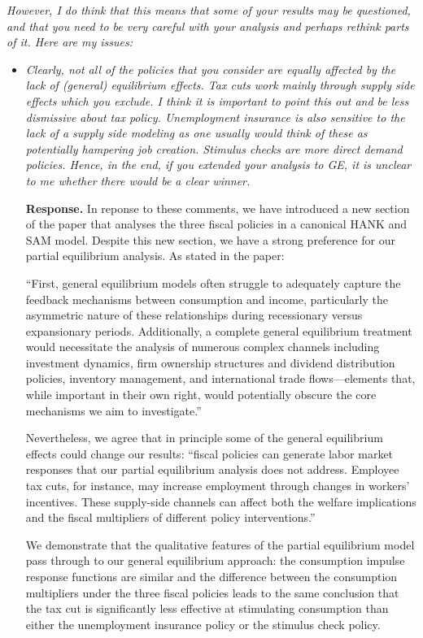 \documentclass[12pt,letterpaper,english]{article}
\begin{document}
\begin{enumerate}
\textit{However, I do think that this means that some of your results may be questioned,	and that you need to be very careful with your analysis and perhaps rethink parts of it. Here are my issues:}

\begin{itemize}
	\item \textit{Clearly, not all of the policies that you consider are equally affected by the lack of (general) equilibrium effects. Tax cuts work mainly through supply		side effects which you exclude. I think it is important to point this out and be less dismissive about tax policy. Unemployment insurance is also sensitive to the lack of a supply side modeling as one usually would think of these as potentially hampering job creation. Stimulus checks are more direct demand policies. Hence, in the end, if you extended your analysis to GE, it is unclear to me whether there would be a clear winner.}
	
\noindent \textbf{Response.} In reponse to these comments, we have introduced a new section of the paper that analyses the three fiscal policies in a canonical HANK and SAM model. Despite this new section, we have a strong preference for our partial equilibrium analysis. As stated in the paper:

``First, general equilibrium models often struggle to adequately capture the feedback mechanisms between consumption and income, particularly the asymmetric nature of these relationships during recessionary versus expansionary periods. Additionally, a complete general equilibrium treatment would necessitate the analysis of numerous complex channels including investment dynamics, firm ownership structures and dividend distribution policies, inventory management, and international trade flows—elements that, while important in their own right, would potentially obscure the core mechanisms we aim to investigate.''

Nevertheless, we agree that in principle some of the general equilibrium effects could change our results: ``fiscal policies can generate labor market responses that our partial equilibrium
analysis does not address. Employee tax cuts, for instance, may increase employment through changes in workers’ incentives. These supply-side channels can affect both the welfare implications and the fiscal multipliers of different policy interventions.'' 

We demonstrate that the qualitative features of the partial equilibrium model pass through to our general equilibrium approach: the consumption impulse response functions are similar and the difference between the consumption multipliers under the three fiscal policies leads to the same conclusion that the tax cut is significantly less effective at stimulating consumption than either the unemployment insurance policy or the stimulus check policy.
	

\end{itemize}
\end{enumerate}
\end{document}
